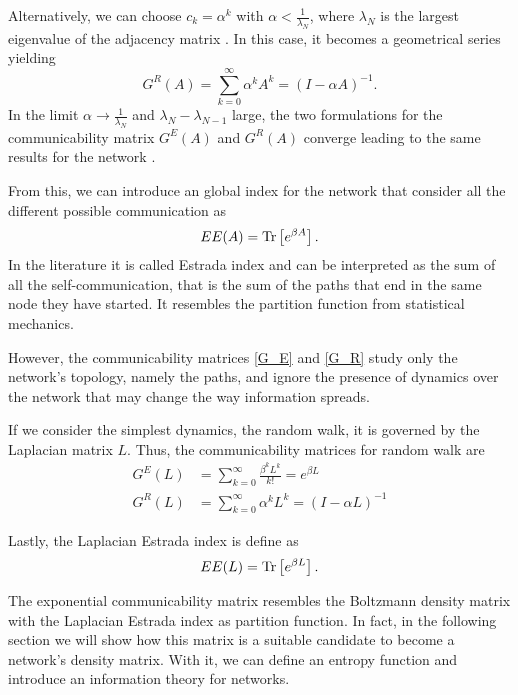 Alternatively, we can choose $c_k = \alpha^{k}$ with $\alpha<\frac{1}{\lambda_N}$, where $\lambda_N$ is the largest eigenvalue of the adjacency matrix \cite{Katz}. In this case, it becomes a geometrical series yielding
\begin{equation}\label{G_R}
    G^R(A) =\sum_{k=0}^{\infty} \alpha^k A^k = (I -\alpha A)^{-1}.
\end{equation}
In the limit $\alpha \rightarrow \frac{1}{\lambda_N}$ and $\lambda_N -\lambda_{N-1}$ large, the two formulations for the communicability matrix $G^E(A)$ and $G^R(A)$ converge leading to the same results for the network \cite{Benzi_Klymko}.


From this, we can introduce an global index for the network that consider all the different possible communication as
\begin{equation}
    EE(A)  = \operatorname{Tr}\left[e^{\beta A}\right].
\end{equation}
In the literature it is called Estrada index \cite{Estrada_2008} and can be interpreted as the sum of all the self-communication, that is the sum of the paths that end in the same node they have started. It resembles the partition function from statistical mechanics.


However, the communicability matrices \eqref{G_E} and \eqref{G_R} study only the network's topology, namely the paths, and ignore the presence of dynamics over the network that may change the way information spreads.

If we consider the simplest dynamics, the random walk, it is governed by the Laplacian matrix $L$. 
Thus, the communicability matrices for random walk are \cite{Estrada_2012}
\begin{equation}\label{Estrada indeces}
    \begin{split}
        G^E(L) &=\sum_{k=0}^{\infty} \frac{\beta^k L^k}{k!} = e^{\beta L}  \\ 
        G^R(L) &= \sum_{k=0}^{\infty} \alpha^k L^k = (I -\alpha L)^{-1}
    \end{split}
\end{equation}

Lastly, the Laplacian Estrada index is define as
\begin{equation}\label{EE_L}
    EE(L) = \operatorname{Tr}\left[e^{\beta L}\right].
\end{equation}

The exponential communicability matrix resembles the Boltzmann density matrix with the Laplacian Estrada index as partition function. In fact, in the following section we will show how this matrix is a suitable candidate to become a network's density matrix. With it, we can define an entropy function and introduce an information theory for networks. 

